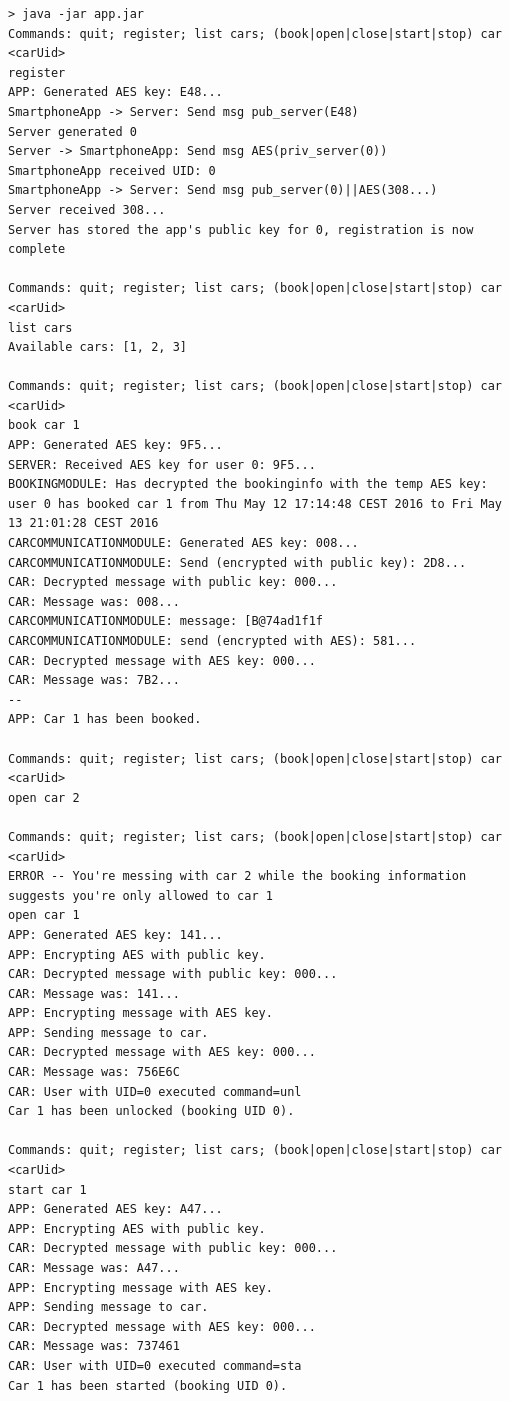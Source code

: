 \documentclass[12pt,a4paper, oneside]{article}
\begin{document}
\begin{lstlisting}[caption=Example execution, label=lst:execution, numbers=none, keywords={},keywordstyle=\ttfamily]
> java -jar app.jar
Commands: quit; register; list cars; (book|open|close|start|stop) car <carUid>
register
APP: Generated AES key: E48...
SmartphoneApp -> Server: Send msg pub_server(E48)
Server generated 0
Server -> SmartphoneApp: Send msg AES(priv_server(0))
SmartphoneApp received UID: 0
SmartphoneApp -> Server: Send msg pub_server(0)||AES(308...)
Server received 308...
Server has stored the app's public key for 0, registration is now complete

Commands: quit; register; list cars; (book|open|close|start|stop) car <carUid>
list cars
Available cars: [1, 2, 3]

Commands: quit; register; list cars; (book|open|close|start|stop) car <carUid>
book car 1
APP: Generated AES key: 9F5...
SERVER: Received AES key for user 0: 9F5...
BOOKINGMODULE: Has decrypted the bookinginfo with the temp AES key: user 0 has booked car 1 from Thu May 12 17:14:48 CEST 2016 to Fri May 13 21:01:28 CEST 2016
CARCOMMUNICATIONMODULE: Generated AES key: 008...
CARCOMMUNICATIONMODULE: Send (encrypted with public key): 2D8...
CAR: Decrypted message with public key: 000...
CAR: Message was: 008...
CARCOMMUNICATIONMODULE: message: [B@74ad1f1f
CARCOMMUNICATIONMODULE: send (encrypted with AES): 581...
CAR: Decrypted message with AES key: 000...
CAR: Message was: 7B2...
--
APP: Car 1 has been booked.

Commands: quit; register; list cars; (book|open|close|start|stop) car <carUid>
open car 2

Commands: quit; register; list cars; (book|open|close|start|stop) car <carUid>
ERROR -- You're messing with car 2 while the booking information suggests you're only allowed to car 1
open car 1
APP: Generated AES key: 141...
APP: Encrypting AES with public key.
CAR: Decrypted message with public key: 000...
CAR: Message was: 141...
APP: Encrypting message with AES key.
APP: Sending message to car.
CAR: Decrypted message with AES key: 000...
CAR: Message was: 756E6C
CAR: User with UID=0 executed command=unl
Car 1 has been unlocked (booking UID 0).

Commands: quit; register; list cars; (book|open|close|start|stop) car <carUid>
start car 1
APP: Generated AES key: A47...
APP: Encrypting AES with public key.
CAR: Decrypted message with public key: 000...
CAR: Message was: A47...
APP: Encrypting message with AES key.
APP: Sending message to car.
CAR: Decrypted message with AES key: 000...
CAR: Message was: 737461
CAR: User with UID=0 executed command=sta
Car 1 has been started (booking UID 0).


\end{lstlisting}
\end{document}
